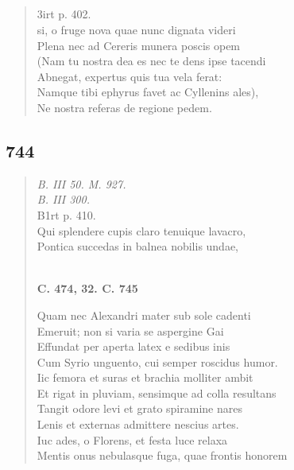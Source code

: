 \documentclass[11pt, a4paper]{report}
\begin{document}
\begin{verse}
      \end{verse}
  
            \subsection*{}
      \begin{verse}
      3irt p. 402. \\ si, o fruge nova quae nunc dignata videri \\ Plena nec ad Cereris munera poscis opem \\ (Nam tu nostra dea es nec te dens ipse tacendi \\ Abnegat, expertus quis tua vela ferat: \\ Namque tibi ephyrus favet ac Cyllenins ales), \\ Ne nostra referas de regione pedem. \\ 
      \end{verse}
  
            \subsection*{744}
      \begin{verse}
      \textit{B. III 50. M. 927.} \\ \textit{B. III 300.} \\ B1rt p. 410. \\ Qui splendere cupis claro tenuique lavacro, \\ Pontica succedas in balnea nobilis undae, \\ 
        ﻿\pagebreak 
     \marginpar{[230]} \begin{center} \textbf{C. 474, 32. C. 745} \end{center}Quam nec Alexandri mater sub sole cadenti \\ Emeruit; non si varia se aspergine Gai \\ Effundat per aperta latex e sedibus inis \\ Cum Syrio unguento, cui semper roscidus humor. \\ Iic femora et suras et brachia molliter ambit \\ Et rigat in pluviam, sensimque ad colla resultans \\ Tangit odore levi et grato spiramine nares \\ Lenis et externas admittere nescius artes. \\ Iuc ades, o Florens, et festa luce relaxa \\ Mentis onus nebulasque fuga, quae frontis honorem \\ 
      \end{verse}
  
\end{document}
